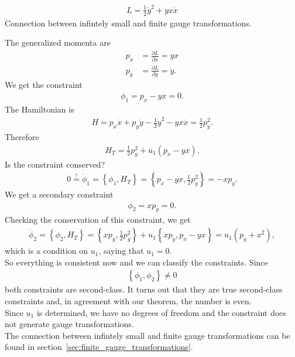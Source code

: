 \begin{exercise}
\begin{align*}
L = \frac{1}{2} \dot{y}^2 + yx\dot{x}
\end{align*}
Connection between infintely small and finite gauge transformations. 
\end{exercise}
\begin{solution}
The generalized momenta are
\begin{align*}
p_x &= \frac{\partial L}{\partial \dot{x}} = yx \\
p_y &= \frac{\partial L}{\partial \dot{y}} = \dot{y}.
\end{align*}
We get the constraint 
\begin{align*}
\phi_1 = p_x - yx = 0.
\end{align*}
The Hamiltonian is
\begin{align*}
H = p_x \dot{x} + p_y \dot{y} - \frac{1}{2} \dot{y}^2 - yx\dot{x} = \frac{1}{2} p_y^2.
\end{align*}
Therefore
\begin{align*}
H_T = \frac{1}{2} p_y^2 + u_1 (p_x - yx).
\end{align*}
Is the constraint conserved?
\begin{align*}
0 \overset{?}{=} \dot{\phi}_1 = \left \{ \phi_1,H_T \right \} = \left \{ p_x - yx,\frac{1}{2} p_y^2 \right \} = - x p_y.
\end{align*}
We get a secondary constraint
\begin{align*}
\phi_2 = x p_y = 0.
\end{align*}
Checking the conservation of this constraint, we get
\begin{align*}
\dot{\phi}_2 = \left \{ \phi_2,H_T \right \} = \left \{ x p_y,\frac{1}{2} p_y^2 \right \} + u_1 \left \{ x p_y,p_x - yx \right \} = u_1 (p_y + x^2),
\end{align*}
which is a condition on $u_1$, saying that $u_1 = 0$. \\
So everything is consistent now and we can classify the constraints. Since
\begin{align*}
\left \{ \phi_1,\phi_2 \right \} \neq 0
\end{align*}
both constraints are second-class. It turns out that they are true second-class constraints and, in agreement with our theorem, the number is even. \\
Since $u_1$ is determined, we have no degrees of freedom and the constraint does not generate gauge transformations. \\

The connection between infintely small and finite gauge transformations can be found in section~\vref{sec:finite_gauge_transformations}.
\end{solution}





